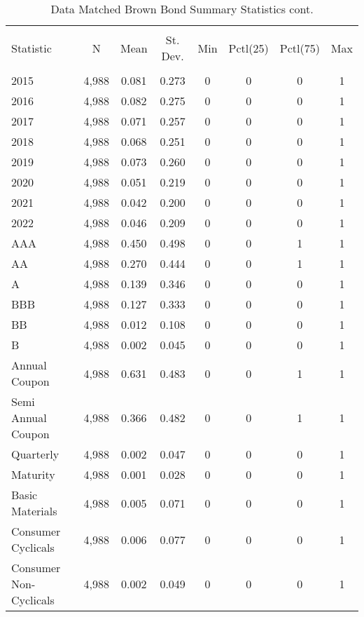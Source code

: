 \begin{table}[!ht] \centering 
  \footnotesize
  \caption{Data Matched Brown Bond Summary Statistics cont.} 
  \label{} 
\begin{tabular}{@{\extracolsep{5pt}}lccccccc} 
\\[-1.8ex]\hline 
\hline \\[-1.8ex] 
Statistic & \multicolumn{1}{c}{N} & \multicolumn{1}{c}{Mean} & \multicolumn{1}{c}{St. Dev.} & \multicolumn{1}{c}{Min} & \multicolumn{1}{c}{Pctl(25)} & \multicolumn{1}{c}{Pctl(75)} & \multicolumn{1}{c}{Max} \\ 
\hline \\[-1.8ex]
2015 & 4,988 & 0.081 & 0.273 & 0 & 0 & 0 & 1 \\ 
2016 & 4,988 & 0.082 & 0.275 & 0 & 0 & 0 & 1 \\ 
2017 & 4,988 & 0.071 & 0.257 & 0 & 0 & 0 & 1 \\ 
2018 & 4,988 & 0.068 & 0.251 & 0 & 0 & 0 & 1 \\ 
2019 & 4,988 & 0.073 & 0.260 & 0 & 0 & 0 & 1 \\ 
2020 & 4,988 & 0.051 & 0.219 & 0 & 0 & 0 & 1 \\ 
2021 & 4,988 & 0.042 & 0.200 & 0 & 0 & 0 & 1 \\ 
2022 & 4,988 & 0.046 & 0.209 & 0 & 0 & 0 & 1 \\ 
AAA & 4,988 & 0.450 & 0.498 & 0 & 0 & 1 & 1 \\ 
AA & 4,988 & 0.270 & 0.444 & 0 & 0 & 1 & 1 \\ 
A & 4,988 & 0.139 & 0.346 & 0 & 0 & 0 & 1 \\ 
BBB & 4,988 & 0.127 & 0.333 & 0 & 0 & 0 & 1 \\ 
BB & 4,988 & 0.012 & 0.108 & 0 & 0 & 0 & 1 \\ 
B & 4,988 & 0.002 & 0.045 & 0 & 0 & 0 & 1 \\ 
Annual Coupon & 4,988 & 0.631 & 0.483 & 0 & 0 & 1 & 1 \\ 
Semi Annual Coupon & 4,988 & 0.366 & 0.482 & 0 & 0 & 1 & 1 \\ 
Quarterly & 4,988 & 0.002 & 0.047 & 0 & 0 & 0 & 1 \\ 
Maturity & 4,988 & 0.001 & 0.028 & 0 & 0 & 0 & 1 \\ 
Basic Materials & 4,988 & 0.005 & 0.071 & 0 & 0 & 0 & 1 \\ 
Consumer Cyclicals & 4,988 & 0.006 & 0.077 & 0 & 0 & 0 & 1 \\ 
Consumer Non-Cyclicals & 4,988 & 0.002 & 0.049 & 0 & 0 & 0 & 1 \\ 

\end{tabular}
\end{table}
